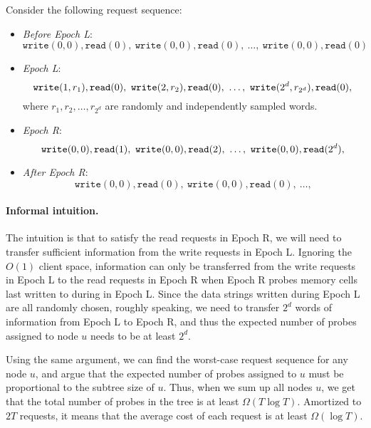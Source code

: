 Consider the following request sequence:
\begin{itemize}[leftmargin=5mm]
\item 
{\it Before Epoch L}: 
\[\texttt{write}(0, {0}), \texttt{read}(0), \ 
\texttt{write}(0, {0}), \texttt{read}(0), \ 
\ldots, \  \texttt{write}(0, {0}), \texttt{read}(0)\]
\item 
{\it Epoch L}: 
\[\texttt{write}(1, r_1), \texttt{read}(0), \ 
\texttt{write}(2, r_2), \texttt{read}(0), \ 
\ldots,  \ 
\texttt{write}(2^d, r_{2^d}), \texttt{read}(0),\\
\]
where $r_1, r_2, \ldots,  r_{2^d}$
are randomly and independently sampled words. 
\item 
{\it Epoch R}:
\[
\texttt{write}(0, 0), \texttt{read}(1), \ 
\texttt{write}(0, 0), \texttt{read}(2), \ 
\ldots,  \ 
\texttt{write}(0, 0), \texttt{read}(2^d),\\
\]

\item 
{\it After Epoch R}:
\[
\texttt{write}(0, 0), \texttt{read}(0), \ 
\texttt{write}(0, 0), \texttt{read}(0), \ 
\ldots,  
\]
\end{itemize}


\elaine{TODO: insert figure}


\paragraph{Informal intuition.}
The intuition is that to satisfy the read requests in %
Epoch R, 
we will need to transfer sufficient information
from the write requests in %
Epoch L.
Ignoring the %
$O(1)$ client space, 
information can only be transferred from
the write requests in %
Epoch L 
to the read requests in %
Epoch R
when %
Epoch R probes memory cells last written to 
during %
in Epoch L. 
Since the data strings written during Epoch L
are all randomly chosen,  roughly speaking, 
we need to transfer $2^d$ words of  
information from Epoch L to Epoch R, and thus
the expected number of probes assigned to node $u$
needs to be at least $2^d$.

Using the same argument, we can find the worst-case
request sequence for any node $u$, and argue
that the expected number  
of probes assigned to $u$ 
must be proportional to the subtree size of $u$.
Thus, when we sum up all nodes $u$, we get
that the total number of probes in the tree is 
at least $\Omega(T  \log T)$.
Amortized to $2T$ requests, it means that 
the average 
cost of each request 
is at least $\Omega(\log T)$.

